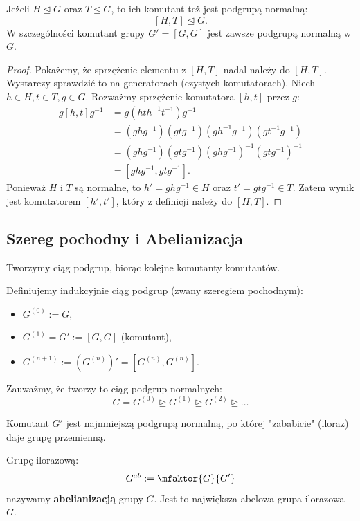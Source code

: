 \begin{fact}
	Jeżeli $H\unlhd G$ oraz $T\unlhd G$, to ich komutant też jest podgrupą normalną:
	\[ \left[ H,T \right] \unlhd G. \]
	W szczególności komutant grupy $G' = [G,G]$ jest zawsze podgrupą normalną w $G$.
\end{fact}
\begin{proof}
	Pokażemy, że sprzężenie elementu z $[H,T]$ nadal należy do $[H,T]$. Wystarczy sprawdzić to na generatorach (czystych komutatorach).
	Niech $h \in H, t \in T, g \in G$. Rozważmy sprzężenie komutatora $[h,t]$ przez $g$:
	\begin{align*}
		g [h,t] g^{-1} &= g (hth^{-1}t^{-1}) g^{-1} \\
		&= (ghg^{-1}) (gtg^{-1}) (gh^{-1}g^{-1}) (gt^{-1}g^{-1}) \\
		&= (ghg^{-1}) (gtg^{-1}) (ghg^{-1})^{-1} (gtg^{-1})^{-1} \\
		&= [ghg^{-1}, gtg^{-1}].
	\end{align*}
	Ponieważ $H$ i $T$ są normalne, to $h' = ghg^{-1} \in H$ oraz $t' = gtg^{-1} \in T$.
	Zatem wynik jest komutatorem $[h', t']$, który z definicji należy do $[H,T]$.
\end{proof} 

\subsection{Szereg pochodny i Abelianizacja}

Tworzymy ciąg podgrup, biorąc kolejne komutanty komutantów.

\begin{definition}
	Definiujemy indukcyjnie ciąg podgrup (zwany szeregiem pochodnym):
	\begin{itemize}
		\item $G^{\left( 0 \right) }:= G$,
		\item $G^{\left( 1 \right) }= G' := \left[ G,G \right] $ (komutant),
		\item $G^{(n+1)} := \left( G^{(n)} \right)' = \left[ G^{\left( n \right) }, G^{\left( n \right) } \right] $.
	\end{itemize}
	Zauważmy, że tworzy to ciąg podgrup normalnych:
	\[ G = G^{(0)} \unrhd G^{(1)} \unrhd G^{(2)} \unrhd \ldots \]
\end{definition} 

Komutant $G'$ jest najmniejszą podgrupą normalną, po której "zababicie" (iloraz) daje grupę przemienną.

\begin{definition}[Abelianizacja]
	Grupę ilorazową:
	\[ G^{ab} := \mfaktor{G}{G'} \]
	nazywamy \textbf{abelianizacją} grupy $G$. Jest to największa abelowa grupa ilorazowa $G$.
\end{definition} 

